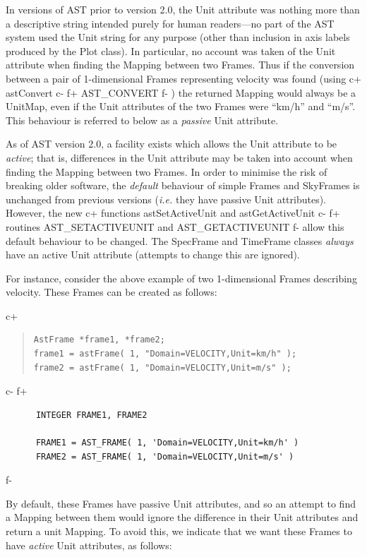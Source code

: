 \documentclass[twoside,11pt]{article}
\begin{document}
In versions of AST prior to version 2.0, the Unit attribute was nothing
more than a descriptive string intended purely for human readers---no
part of the AST system used the Unit string for any purpose (other than
inclusion in axis labels produced by the Plot class). In particular, no
account was taken of the Unit attribute when finding the Mapping between
two Frames. Thus if the conversion between a pair of 1-dimensional Frames
representing velocity was found (using
c+
astConvert
c-
f+
AST\_CONVERT
f-
) the returned Mapping would always be a UnitMap, even if the Unit
attributes of the two Frames were ``km/h'' and ``m/s''. This behaviour is
referred to below as a \emph{passive} Unit attribute.

As of AST version 2.0, a facility exists which allows the Unit attribute
to be \emph{active}; that is, differences in the
Unit attribute may be taken into account when finding the Mapping between
two Frames. In order to minimise the risk of breaking older software, the
\emph{default} behaviour of simple Frames and SkyFrames is unchanged from
previous versions (\emph{i.e.} they have passive Unit attributes). However,
the new
c+
functions astSetActiveUnit and astGetActiveUnit
c-
f+
routines AST\_SETACTIVEUNIT and AST\_GETACTIVEUNIT
f-
allow this default behaviour to be changed. The SpecFrame and TimeFrame
classes \emph{always} have an active Unit attribute (attempts to change this
are ignored).

For instance, consider the above example of two 1-dimensional Frames
describing velocity. These Frames can be created as follows:

c+
\begin{quote}
\small
\begin{verbatim}
AstFrame *frame1, *frame2;
frame1 = astFrame( 1, "Domain=VELOCITY,Unit=km/h" );
frame2 = astFrame( 1, "Domain=VELOCITY,Unit=m/s" );
\end{verbatim}
\normalsize
\end{quote}
c-
f+
\small
\begin{verbatim}
      INTEGER FRAME1, FRAME2

      FRAME1 = AST_FRAME( 1, 'Domain=VELOCITY,Unit=km/h' )
      FRAME2 = AST_FRAME( 1, 'Domain=VELOCITY,Unit=m/s' )

\end{verbatim}
\normalsize
f-

By default, these Frames have passive Unit attributes, and so an attempt
to find a Mapping between them would ignore the difference in their Unit
attributes and return a unit Mapping. To avoid this, we indicate that we
want these Frames to have \emph{active} Unit attributes, as follows:
\end{document}
